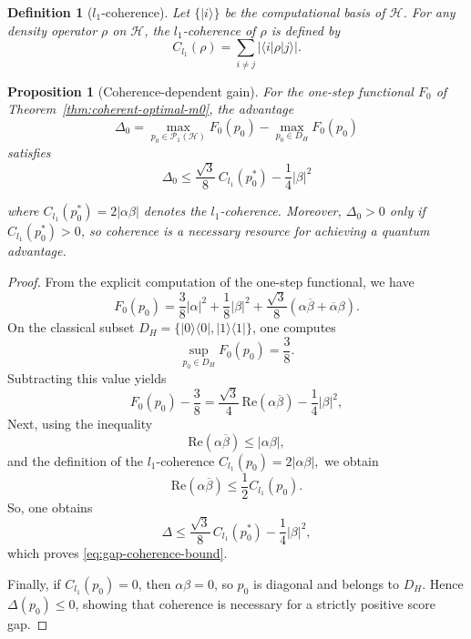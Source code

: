 \documentclass[12pt, reco]{article}
\newtheorem{proposition}[theorem]{Proposition}
\newtheorem{definition}[theorem]{Definition}
\begin{document}
\begin{definition}[\(l_1\)-coherence]
Let \(\{|i\rangle\}\) be the computational basis of \(\mathcal{H}\). 
For any density operator \(\rho\) on \(\mathcal{H}\), the \(l_1\)-coherence of \(\rho\) is defined by
\[
C_{l_1}(\rho)
=
\sum_{i\neq j} \left| \langle i|\rho|j\rangle \right|.
\]
\end{definition}


\begin{proposition}[Coherence-dependent gain]
For the one-step functional \(F_0\) of Theorem~\ref{thm:coherent-optimal-m0}, the advantage
\[
\Delta_0
=
\max_{p_0\in\mathcal{P}_1(\mathcal{H})} F_0(p_0)
-
\max_{p_0\in D_H} F_0(p_0)
\]
satisfies
\begin{equation}\label{eq:gap-coherence-bound}
 \Delta_0
\leq
\frac{\sqrt{3}}{8}\,C_{l_1}(p_0^*)
-
\frac{1}{4}|\beta|^2   
\end{equation}

where $C_{l_1}(p_0^*) = 2|\alpha\beta|$ denotes the $l_1$-coherence. Moreover, $\Delta_0 > 0$ only if $C_{l_1}(p_0^*) > 0$, so coherence is a necessary resource for achieving a quantum advantage.
\end{proposition}
 


\begin{proof}
From the explicit computation of the one-step functional, we have
\[
F_0(p_0)
=
\frac{3}{8}|\alpha|^2
+
\frac{1}{8}|\beta|^2
+
\frac{\sqrt{3}}{8}(\alpha\overline{\beta} + \overline{\alpha}\beta).
\]
On the classical subset $D_H = \{|0\rangle\langle0|, |1\rangle\langle1|\}$, one computes
\[
\sup_{p_0 \in D_H} F_0(p_0) = \frac{3}{8}.
\]
Subtracting this value yields
\[
F_0(p_0) - \frac{3}{8}
=
\frac{\sqrt{3}}{4}\,\mathrm{Re}(\alpha\overline{\beta})
-
\frac{1}{4}|\beta|^2,
\]
Next, using the inequality
\[
\mathrm{Re}(\alpha\overline{\beta}) \le |\alpha\beta|,
\]
and the definition of the $l_1$-coherence
\(
C_{l_1}(p_0) = 2|\alpha\beta|,
\)
we obtain
\[
\mathrm{Re}(\alpha\overline{\beta})
\le
\frac{1}{2}C_{l_1}(p_0).
\]
So, one obtains
\[
\Delta
\le
\frac{\sqrt{3}}{8}\,C_{l_1}(p_0^*)
-
\frac{1}{4}|\beta|^2,
\]
which proves \eqref{eq:gap-coherence-bound}.

Finally, if $C_{l_1}(p_0) = 0$, then $\alpha\beta = 0$, so $p_0$ is diagonal and belongs to $D_H$. Hence $\Delta(p_0) \le 0$, showing that coherence is necessary for a strictly positive score gap.
\end{proof}
\end{document}
